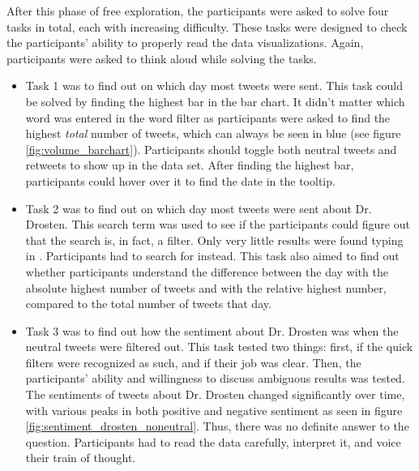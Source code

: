 After this phase of free exploration, the participants were asked to solve four tasks in total, each with increasing difficulty. These tasks were designed to check the participants' ability to properly read the data visualizations. Again, participants were asked to think aloud while solving the tasks.
\begin{itemize}
    \item Task 1 was to find out on which day most tweets were sent. This task could be solved by finding the highest bar in the bar chart. It didn't matter which word was entered in the word filter as participants were asked to find the highest \emph{total} number of tweets, which can always be seen in blue (see figure \ref{fig:volume_barchart}). Participants should toggle both neutral tweets and retweets to show up in the data set. After finding the highest bar, participants could hover over it to find the date in the tooltip.
    \item Task 2 was to find out on which day most tweets were sent about Dr. Drosten. This search term was used to see if the participants could figure out that the search is, in fact, a filter. Only very little results were found typing in . Participants had to search for  instead. This task also aimed to find out whether participants understand the difference between the day with the absolute highest number of tweets and with the relative highest number, compared to the total number of tweets that day.
    \item Task 3 was to find out how the sentiment about Dr. Drosten was when the neutral tweets were filtered out. This task tested two things: first, if the quick filters were recognized as such, and if their job was clear. Then, the participants' ability and willingness to discuss ambiguous results was tested. The sentiments of tweets about Dr. Drosten changed significantly over time, with various peaks in both positive and negative sentiment as seen in figure \ref{fig:sentiment_drosten_noneutral}. Thus, there was no definite answer to the question. Participants had to read the data carefully, interpret it, and voice their train of thought.
    \begin{figure}[htb]

\end{figure}
\end{itemize}
